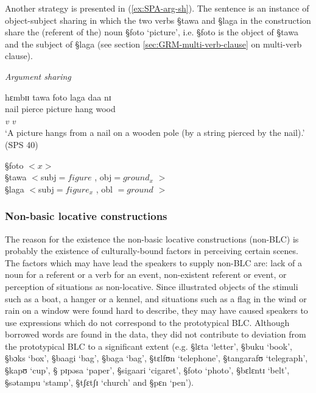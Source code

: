 Another strategy is presented in  (\ref{ex:SPA-arg-sh}). The sentence is an
instance of object-subject  sharing in which the two
verbs  {\S tawa} and {\S laga} in the construction share the (referent of the)
noun {\S foto} `picture',  i.e. {\S foto} is the object of {\S tawa}  and the
subject of {\S laga} (see section \ref{sec:GRM-multi-verb-clause} on
multi-verb clause).

\begin{exe}
\ex\label{ex:SPA-arg-sh}{\it Argument sharing}

\glll  hɛmbɪɪ tawa foto laga daa nɪ\\
nail pierce picture hang wood  {\postp}\\
{} {\it v} {} {\it v} {} {} \\
 \glt `A picture hangs from a nail on a wooden pole (by a string pierced by the
nail).' (SPS 40)


{\S foto} $<x>$\\
{\S tawa} $<${\sc subj}$ =  figure$ ,  {\sc obj}$=ground_{x}$  $> $\\
{\S laga} $<${\sc subj}$ =  figure_{x}$ , {\sc obl} $= ground $  $ >$\\

\end{exe}




\subsubsection{Non-basic locative constructions}
\label{sec:nonBLC}



The reason for the existence the non-basic locative constructions (non-BLC)
is probably  the existence of culturally-bound factors in perceiving
certain scenes.  The factors which may have lead the speakers to supply non-BLC
are: lack of a noun for a referent or a verb for an event, non-existent referent
or event,  or perception of situations  as non-locative. Since illustrated
objects 
of
the stimuli such as a boat, a hanger or a kennel,  and  situations such as a
flag in the wind or rain on a window were  found hard to describe, they may have
caused speakers to use expressions which do not correspond to the prototypical
BLC. Although borrowed words are found in the data, they did not contribute to
deviation from the prototypical BLC to a significant extent (e.g. {\S lɛta}
`letter',  {\S buku} `book', {\S bɔks} `box', {\S baagi} `bag', {\S baga} `bag',
{\S tɛlfʊn} `telephone', {\S tangarafʊ} `telegraph', {\S kapʊ} `cup', {\S
pɪpəsa} `paper', {\S sigaari} `cigaret', {\S foto} `photo', {\S bɛlɛntɪ} `belt',
{\S sətampu} `stamp', {\S tʃɛtʃɪ} `church'  and {\S pɛn} `pen'). 

